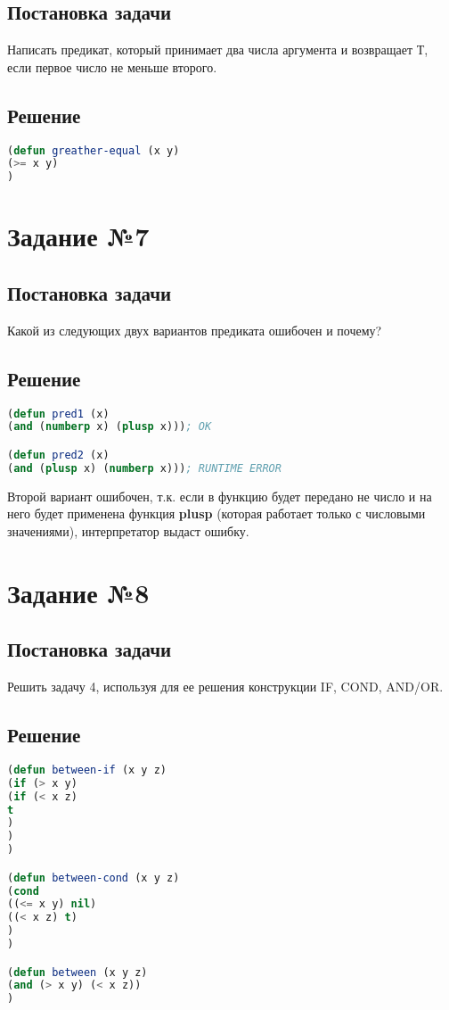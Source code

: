 \subsection*{Постановка задачи}
Написать предикат, который принимает два числа аргумента и возвращает Т, если первое число не меньше второго.

\subsection*{Решение}
\begin{lstlisting}[label=6,caption=Решение задания №6, language=lisp]
(defun greather-equal (x y) 
(>= x y)
)
\end{lstlisting}

\section*{Задание №7}
\subsection*{Постановка задачи}
Какой из следующих двух вариантов предиката ошибочен и почему? 

\subsection*{Решение}
\begin{lstlisting}[label=7,caption=Решение задания №7, language=lisp]
(defun pred1 (x)
(and (numberp x) (plusp x))); OK

(defun pred2 (x)
(and (plusp x) (numberp x))); RUNTIME ERROR
\end{lstlisting}

Второй вариант ошибочен, т.к. если в функцию будет передано не число и на него будет применена функция \textbf{plusp} (которая работает только с числовыми значениями), интерпретатор выдаст ошибку.

\section*{Задание №8}
\subsection*{Постановка задачи}
Решить задачу 4, используя для ее решения конструкции IF, COND, AND/OR.

\subsection*{Решение}
\begin{lstlisting}[label=8,caption=Решение задания №8, language=lisp]
(defun between-if (x y z) 
(if (> x y) 
(if (< x z)
t
)
)
)

(defun between-cond (x y z) 
(cond
((<= x y) nil)
((< x z) t)
)
)

(defun between (x y z) 
(and (> x y) (< x z))
)
\end{lstlisting}



